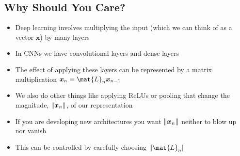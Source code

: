 
\begin{slide}
\section[-2]{Why Should You Care?}

\begin{PauseHighLight}
  \begin{itemize}
  \item Deep learning involves multiplying the input (which we can think
    of as a vector $\bm{x}$) by many layers\pause
  \item In CNNs we have convolutional layers and dense layers\pause
  \item The effect of applying these layers can be represented by a
    matrix multiplication $\bm{x}_n = \mat{L}_n \bm{x}_{n-1}$\pause
  \item We also do other things like applying ReLUs or pooling that
    change the magnitude, $\| \bm{x}_n \|$, of our representation\pause
  \item If you are developing new architectures you want
    $\| \bm{x}_n \|$ neither to blow up nor vanish\pause
  \item This can be controlled by carefully choosing $\len{\mat{L}_n}$\pause
  \end{itemize}
\end{PauseHighLight}

\end{slide}



